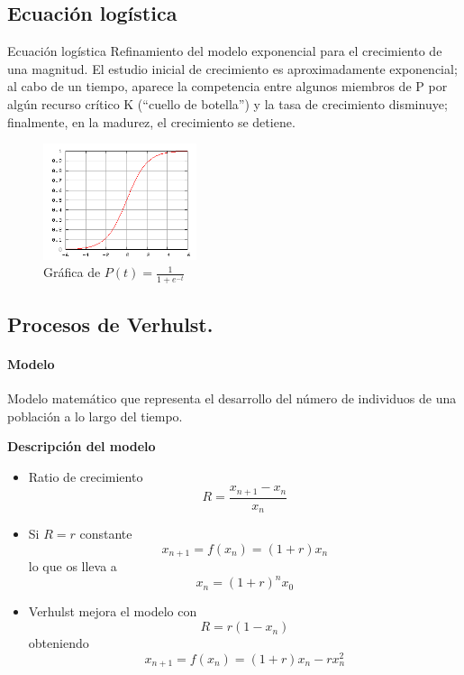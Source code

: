 \documentclass[8pt]{beamer}
\begin{document}
\subsection{Ecuación logística}

\begin{frame}
\begin{block}{Ecuación logística}
Refinamiento del modelo exponencial para el crecimiento de una magnitud. El estudio inicial de crecimiento es aproximadamente exponencial; al cabo de un tiempo, aparece la competencia entre algunos miembros de P por algún recurso crítico K (``cuello de botella'') y la tasa de crecimiento disminuye; finalmente, en la madurez, el crecimiento se detiene.
\end{block}

\begin{figure}[H]
\centering
\includegraphics[width = 0.4\textwidth]{img/EcuacionLogistica.png}
\caption{Gráfica de $P(t) = \frac{1}{1+e^{-t}}$}
\label{fig:EcLogistica}
\end{figure}

\end{frame}

\subsection{Procesos de Verhulst.}

\begin{frame}
\framesubtitle{Modelo}
\begin{definition}
Modelo matemático que representa el desarrollo del número de individuos de una población a lo largo del tiempo.
\end{definition}

\textbf{Descripción del modelo}
\begin{itemize}
\item Ratio de crecimiento
\[R=\frac{x_{n+1}-x_n}{x_n}\]

\item Si $R=r$ constante
\[x_{n+1} = f(x_n) = (1+r)x_n\]
lo que os lleva a
\[x_n = (1+r)^nx_0\]

\item Verhulst mejora el modelo con
\[R=r(1-x_n)\]
obteniendo
\begin{equation}\label{eq:Verhulst}
x_{n+1} = f(x_n) = (1+r)x_n - rx_n^2
\end{equation}
\end{itemize}
\end{frame}
\end{document}
